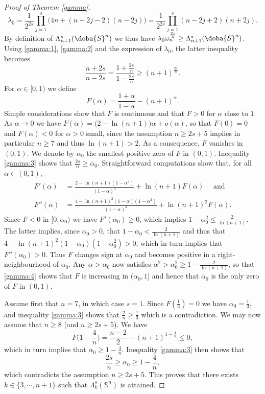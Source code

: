 \documentclass[10pt]{amsart}
\numberwithin{equation}{section}
\def\La{{\Lambda}}
\gdef\mS{\doba{S}}
\theoremstyle{plain}
\theoremstyle{remark}
\begin{document}
\begin{proof}[Proof of Theorem \ref{gamma}]
\begin{equation} \label{def:lambda0:kn}
 \lambda_0 =  \frac{1}{2^{2s}}  \prod_{j=1}^s \Big( 4n + (n+2j-2)(n-2j) \Big) = \frac{1}{2^{2s}}  \prod_{j=1}^s (n-2j+2)(n+2j)  . 
 \end{equation}
By definition of $\La_{n+1}^s(\mS^n)$ we thus have $\lambda_0 \omega_n^{\frac{2s}{n}} \ge \La_{n+1}^s(\mS^n)$. Using \eqref{gamma:1}, \eqref{gamma:2} and the expression of $\lambda_0$, the latter inequality becomes 
\begin{equation} \label{gamma:3}
\frac{n+2s}{n-2s}  = \frac{1+ \frac{2s}{n}}{1 - \frac{2s}{n}}\ge (n+1)^{\frac{2s}{n}}. 
\end{equation} 
For $\alpha \in [0,1)$ we define 
$$ F(\alpha) = \frac{1+\alpha}{1-\alpha} - (n+1)^{\alpha}. $$
Simple considerations show that $F$ is continuous and that $F >0$ for $\alpha$ close to $1$. As $\alpha \to 0$ we have $F(\alpha ) = \big( 2 - \ln(n+1) \big) \alpha + o(\alpha)$, so that $F(0)=0$ and  $F(\alpha)<0$ for $\alpha >0$ small, since the assumption $n \ge 2s+5$ implies in particular $n \ge 7$ and thus $\ln(n+1) >2$. As a consequence, $F$ vanishes in $(0,1)$. We denote by $\alpha_0$ the smallest positive zero of $F$ in $(0,1)$. Inequality  \eqref{gamma:3}  shows that $\frac{2s}{n} \ge \alpha_0$. Straightforward computations show that, for all  $\alpha \in (0,1)$,
\begin{equation} \label{gamma:4}
\begin{aligned}
 F'(\alpha) & = \frac{2 - \ln(n+1)(1-\alpha^2)}{(1-\alpha)^2} + \ln(n+1) F(\alpha) \quad  \text{ and } \\
 F''(\alpha) & = \frac{4 - \ln(n+1)^2(1-\alpha)(1-\alpha^2)}{(1-\alpha)^3} + \ln(n+1)^2 F(\alpha). 
 \end{aligned} 
 \end{equation}
Since $F<0$ in $[0, \alpha_0)$ we have $F'(\alpha_0) \ge 0$, which implies $1-\alpha_0^2 \le \frac{2}{\ln(n+1)}$. The latter implies, since $\alpha_0 >0$, that $1- \alpha_0 < \frac{2}{\ln(n+1)}$ and thus that $4 - \ln(n+1)^2(1-\alpha_0)(1-\alpha_0^2) >0$, which in turn implies that $F''(\alpha_0) >0$. Thus $F$ changes sign at $\alpha_0$ and becomes positive in a right-neighbourhood of $\alpha_0$. Any $\alpha > \alpha_0$ now satisfies $\alpha^2 > \alpha_0^2 \ge 1 - \frac{2}{\ln(n+1)}$, so that \eqref{gamma:4} shows that $F$ is increasing in $(\alpha_0, 1]$ and hence that $\alpha_0$ is the only zero of $F$ in $(0,1)$.

Assume first that $n=7$, in which case $s=1$. Since $F(\frac13) = 0$ we have $\alpha_0 = \frac13$, and inequality  \eqref{gamma:3} shows that $\frac{2}{n} \ge \frac13$ which is a contradiction. We may now assume that $n \ge 8$ (and $n \ge 2s+5$). We have 
$$ F\big (1 -  \frac{4}{n} \big) = \frac{n-2}{2} - (n+1)^{1-\frac{4}{n}} \le 0,$$
which in turn implies that $\alpha_0 \ge 1 - \frac{4}{n}$. Inequality \eqref{gamma:3} then shows that 
$$\frac{2s}{n} \ge \alpha_0 \ge 1 - \frac{4}{n}, $$
which contradicts the assumption $n \ge 2s+5$. This proves that there exists $k \in \{3, \cdots, n+1\}$ such that $\Lambda_k^s(\mathbb{S}^n)$ is attained.


\end{proof}
\end{document}
